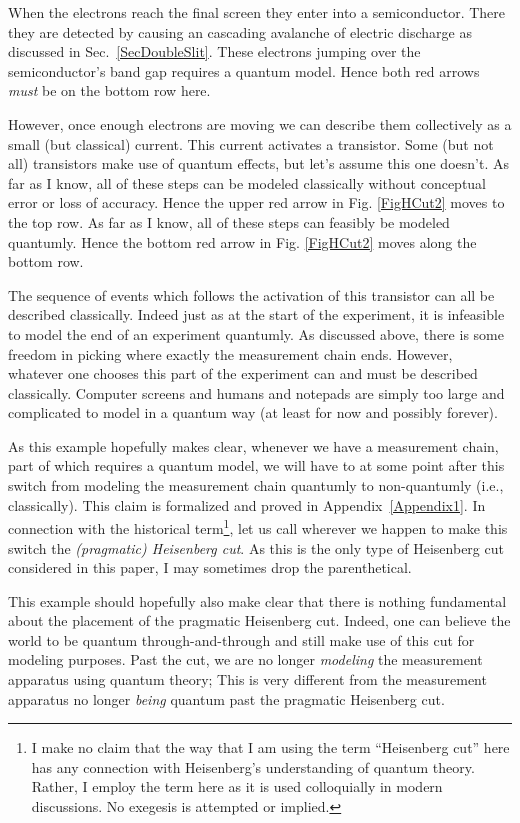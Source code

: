 \documentclass[12pt,prd,superscriptaddress,floatfix,amsmath,amssymb,amsfonts,nofootinbib]{revtex4-2}
\begin{document}
When the electrons reach the final screen they enter into a  semiconductor. There they are detected by causing an cascading avalanche of electric discharge as discussed in Sec.~\ref{SecDoubleSlit}. These electrons jumping over the semiconductor's band gap requires a quantum model. Hence both red arrows \textit{must} be on the bottom row here. 

However, once enough electrons are moving we can describe them collectively as a small (but classical) current. This current activates a transistor. Some (but not all) transistors make use of quantum effects, but let's assume this one doesn't. As far as I know, all of these steps can be modeled classically without conceptual error or loss of accuracy. Hence the upper red arrow in Fig. \ref{FigHCut2} moves to the top row. As far as I know, all of these steps can feasibly be modeled quantumly. Hence the bottom red arrow in Fig. \ref{FigHCut2} moves along the bottom row.

The sequence of events which follows the activation of this transistor can all be described classically. Indeed just as at the start of the experiment, it is infeasible to model the end of an experiment quantumly. As discussed above, there is some freedom in picking where exactly the measurement chain ends. However, whatever one chooses this part of the experiment can and must be described classically. Computer screens and humans and notepads are simply too large and complicated to model in a quantum way (at least for now and possibly forever).

As this example hopefully makes clear, whenever we have a measurement chain, part of which requires a quantum model, we will have to at some point after this switch from modeling the measurement chain quantumly to non-quantumly (i.e., classically). This claim is formalized and proved in Appendix~\ref{Appendix1}. In connection with the historical term\footnote{I make no claim that the way that I am using the term ``Heisenberg cut'' here has any connection with Heisenberg's understanding of quantum theory. Rather, I employ the term here as it is used colloquially in modern discussions. No exegesis is attempted or implied.}, let us call wherever we happen to make this switch the \textit{(pragmatic) Heisenberg cut}. As this is the only type of Heisenberg cut considered in this paper, I may sometimes drop the parenthetical.

This example should hopefully also make clear that there is nothing fundamental about the placement of the pragmatic Heisenberg cut. Indeed, one can believe the world to be quantum through-and-through and still make use of this cut for modeling purposes. Past the cut, we are no longer \textit{modeling} the measurement apparatus using quantum theory; This is very different from the measurement apparatus no longer \textit{being} quantum past the pragmatic Heisenberg cut.
\end{document}
